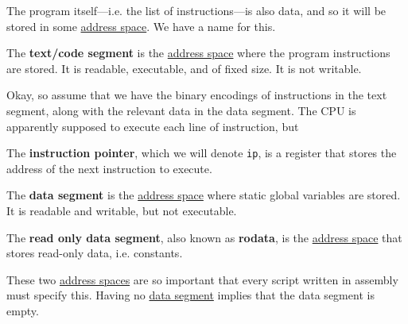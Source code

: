   The program itself---i.e. the list of instructions---is also data, and so it will be stored in some \hyperref[def:address-space]{address space}. We have a name for this. 

  \begin{definition}
    \label{def:text-code-segment}
    The \textbf{text/code segment} is the \hyperref[def:address-space]{address space} where the program instructions are stored. It is readable, executable, and of fixed size. It is not writable. 
  \end{definition}

  Okay, so assume that we have the binary encodings of instructions in the text segment, along with the relevant data in the data segment. The CPU is apparently supposed to execute each line of instruction, but 

  \begin{definition}
    \label{def:instruction-pointer}
    The \textbf{instruction pointer}, which we will denote \texttt{ip}, is a register that stores the address of the next instruction to execute. 
  \end{definition}

  \begin{example}
    \label{ex:execution-of-simple-program}

  \end{example}

  \begin{definition}
    \label{def:data-segment}
    The \textbf{data segment} is the \hyperref[def:address-space]{address space} where static global variables are stored. It is readable and writable, but not executable.
  \end{definition}

  \begin{definition}
    \label{def:read-only-data-segment}
    The \textbf{read only data segment}, also known as \textbf{rodata}, is the \hyperref[def:address-space]{address space} that stores read-only data, i.e. constants. 
  \end{definition}

  These two \hyperref[def:address-space]{address spaces} are so important that every script written in assembly must specify this. Having no \hyperref[def:data-segment]{data segment} implies that the data segment is empty. 

